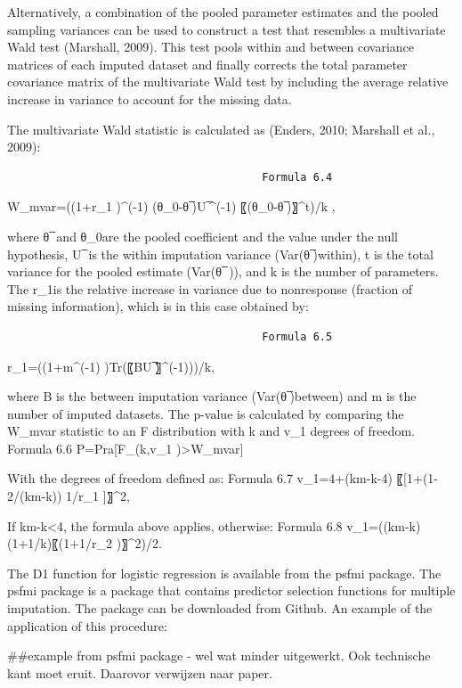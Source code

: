 \documentclass[]{book}
\newenvironment{Shaded}{\begin{snugshade}}{\end{snugshade}}
\newcommand{\NormalTok}[1]{#1}
\begin{document}
Alternatively, a combination of the pooled parameter estimates and the
pooled sampling variances can be used to construct a test that resembles
a multivariate Wald test (Marshall, 2009). This test pools within and
between covariance matrices of each imputed dataset and finally corrects
the total parameter covariance matrix of the multivariate Wald test by
including the average relative increase in variance to account for the
missing data.

The multivariate Wald statistic is calculated as (Enders, 2010; Marshall
et al., 2009):

\begin{verbatim}
                                        Formula 6.4
\end{verbatim}

W\_mvar=((1+r\_1 )\^{}(-1) (θ\_0-θ ̅)U ̅\^{}(-1) 〖(θ\_0-θ ̅)〗\^{}t)/k ,

where θ ̅ and θ\_0are the pooled coefficient and the value under the null
hypothesis, U ̅ is the within imputation variance (Var(θ ̅)within), t is
the total variance for the pooled estimate (Var(θ ̅ )), and k is the
number of parameters. The r\_1is the relative increase in variance due
to nonresponse (fraction of missing information), which is in this case
obtained by:

\begin{verbatim}
                                        Formula 6.5
\end{verbatim}

r\_1=((1+m\^{}(-1) )Tr(〖BU ̅〗\^{}(-1)))/k,

where B is the between imputation variance (Var(θ ̅)between) and m is the
number of imputed datasets. The p-value is calculated by comparing the
W\_mvar statistic to an F distribution with k and v\_1 degrees of
freedom. Formula 6.6 P=Pra{[}F\_(k,v\_1 )\textgreater{}W\_mvar{]}

With the degrees of freedom defined as: Formula 6.7 v\_1=4+(km-k-4)
〖{[}1+(1-2/(km-k)) 1/r\_1 {]}〗\^{}2,

If km-k\textless{}4, the formula above applies, otherwise: Formula 6.8
v\_1=((km-k)(1+1/k)〖(1+1/r\_2 )〗\^{}2)/2.

The D1 function for logistic regression is available from the psfmi
package. The psfmi package is a package that contains predictor
selection functions for multiple imputation. The package can be
downloaded from Github. An example of the application of this procedure:

\begin{Shaded}
\begin{Highlighting}[]
\NormalTok{##example from psfmi package - wel wat minder uitgewerkt. Ook technische kant moet eruit. Daarovor verwijzen naar paper. }
\end{Highlighting}
\end{Shaded}
\end{document}
